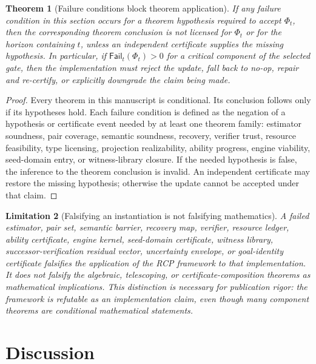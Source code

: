 \documentclass[11pt]{article}
\newtheorem{theorem}{Theorem}[section]
\newtheorem{limitation}[theorem]{Limitation}
\newcommand{\1}{\mathbf{1}}
\begin{document}
\begin{theorem}[Failure conditions block theorem application]
\label{thm:failure_conditions_block_application}
If any failure condition in this section occurs for a theorem hypothesis required to accept \(\Phi_t\), then the corresponding theorem conclusion is not licensed for \(\Phi_t\) or for the horizon containing \(t\), unless an independent certificate supplies the missing hypothesis. In particular, if \(\mathsf{Fail}_t(\Phi_t)>0\) for a critical component of the selected gate, then the implementation must reject the update, fall back to no-op, repair and re-certify, or explicitly downgrade the claim being made.
\end{theorem}

\begin{proof}
Every theorem in this manuscript is conditional. Its conclusion follows only if its hypotheses hold. Each failure condition is defined as the negation of a hypothesis or certificate event needed by at least one theorem family: estimator soundness, pair coverage, semantic soundness, recovery, verifier trust, resource feasibility, type licensing, projection realizability, ability progress, engine viability, seed-domain entry, or witness-library closure. If the needed hypothesis is false, the inference to the theorem conclusion is invalid. An independent certificate may restore the missing hypothesis; otherwise the update cannot be accepted under that claim.
\end{proof}

\begin{limitation}[Falsifying an instantiation is not falsifying mathematics]
A failed estimator, pair set, semantic barrier, recovery map, verifier, resource ledger, ability certificate, engine kernel, seed-domain certificate, witness library, successor-verification residual vector, uncertainty envelope, or goal-identity certificate falsifies the application of the RCP framework to that implementation. It does not falsify the algebraic, telescoping, or certificate-composition theorems as mathematical implications. This distinction is necessary for publication rigor: the framework is refutable as an implementation claim, even though many component theorems are conditional mathematical statements.
\end{limitation}

\section{Discussion}
\end{document}
